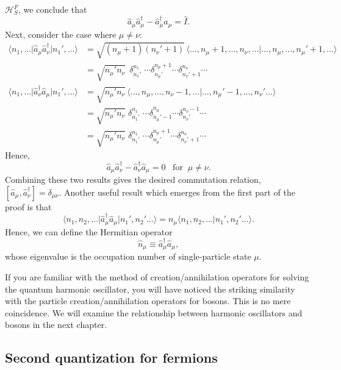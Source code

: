 \documentclass[pra,12pt]{revtex4}
\begin{document}
$\mathscr{H}^F_S$, we conclude that
$$\hat{a}_\mu \hat{a}_\mu^\dagger - \hat{a}_\mu^\dagger \hat{a}_\mu = \hat{I}.$$
Next, consider the case where $\mu \ne \nu$:
$$\begin{aligned}\big\langle n_1, \dots \big| \hat{a}_\mu \hat{a}_\nu^\dagger \big| n_1', \dots\big\rangle &= \sqrt{(n_\mu+1)(n_\nu'+1)}\, \langle \dots, n_\mu+1, \dots, n_\nu, \dots | \dots, n_\mu, \dots, n_\mu'+1, \dots\rangle \\ &= \sqrt{n_\mu' n_\nu} \;\, \delta^{n_1}_{n_1'} \; \cdots \delta^{n_\mu+1}_{n_\mu'} \cdots \delta^{n_\nu}_{n_\nu' + 1}\cdots \\ \big\langle n_1, \dots \big| \hat{a}_\nu^\dagger \hat{a}_\mu \big| n_1', \dots\big\rangle &= \sqrt{n_\mu' n_\nu}\, \langle \dots, n_\mu, \dots,n_\nu-1,\dots | \dots, n_\mu'-1, \dots, n_\nu'\dots\rangle \\&= \sqrt{n_\mu' n_\nu} \;\delta^{n_1}_{n_1'} \; \cdots \delta^{n_\mu}_{n_\mu'-1}\cdots \delta^{n_\nu-1}_{n_\nu'} \cdots \\ &= \sqrt{n_\mu' n_\nu} \; \delta^{n_1}_{n_1'} \; \cdots \delta^{n_\mu+1}_{n_\mu'}\cdots \delta^{n_\nu}_{n_\nu'+1} \cdots\end{aligned}$$
Hence,
$$\hat{a}_\mu \hat{a}_\nu^\dagger - \hat{a}_\nu^\dagger \hat{a}_\mu = 0 \;\;\;\mathrm{for}\;\;\mu\ne\nu.$$
Combining these two results gives the desired commutation relation,
$[\hat{a}_\mu, \hat{a}_\nu^\dagger] = \delta_{\mu\nu}$.  Another useful result which
emerges from the first part of the proof is that
$$\big\langle n_1, n_2, \dots \big| \hat{a}_\mu^\dagger \hat{a}_\mu \big| n_1', n_2'\dots\big\rangle = n_\mu \big\langle n_1, n_2, \dots \big| n_1', n_2'\dots\big\rangle.$$
Hence, we can define the Hermitian operator
$$\hat{n}_\mu \equiv \hat{a}_\mu^\dagger \hat{a}_\mu,$$
whose eigenvalue is the occupation number of single-particle state $\mu$.

If you are familiar with the method of creation/annihilation operators
for solving the quantum harmonic oscillator, you will have noticed the
striking similarity with the particle creation/annihilation operators
for bosons.  This is no mere coincidence.  We will examine the
relationship between harmonic oscillators and bosons in the next
chapter.

\subsection{Second quantization for fermions}
\label{sec:second_quantized_fermions}
\end{document}
